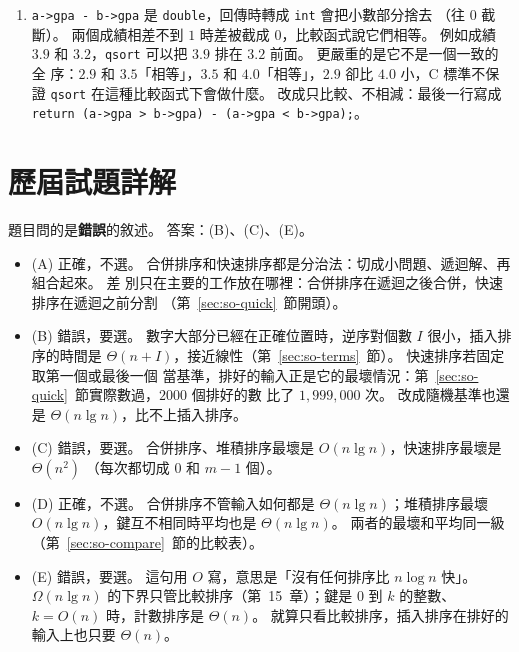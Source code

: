 \begin{enumerate}
(c) $z_k$ 參與的比較就是 $\sum_{j \ne k} X_{kj}$，期望值是
\[
\sum_{j \ne k} \frac{2}{|j - k| + 1}
= 2\left(\frac12 + \cdots + \frac1k\right) + 2\left(\frac12 + \cdots + \frac{1}{n-k+1}\right)
= 2(H_k + H_{n-k+1} - 2).
\]
每次比較有兩個數參與，所以把 $k = 1..n$ 加起來再除以 $2$：
$\mathrm{E}[X] = \sum_{k=1}^{n}(H_k + H_{n-k+1} - 2) = 2\sum_{k=1}^{n} H_k - 2n$。 用
$\sum_{k=1}^{n} H_k = (n+1)H_n - n$，得到 $2(n+1)H_n - 4n$，和定理~\ref{thm:so-quick-avg}
一樣。 這和第~9~章第~\ref{sec:bst-height}~節框裡 $j$ 的期望深度 $H_j + H_{n-j+1} - 2$ 只差一個 $2$ 倍：BST 裡
只算祖先，快速排序裡兩個方向都算。

\item \texttt{a->gpa - b->gpa} 是 \texttt{double}，回傳時轉成 \texttt{int} 會把小數部分捨去
（往 $0$ 截斷）。 兩個成績相差不到 $1$ 時差被截成 $0$，比較函式說它們相等。 例如成績
$3.9$ 和 $3.2$，\texttt{qsort} 可以把 $3.9$ 排在 $3.2$ 前面。 更嚴重的是它不是一個一致的全
序：$2.9$ 和 $3.5$「相等」，$3.5$ 和 $4.0$「相等」，$2.9$ 卻比 $4.0$ 小，C 標準不保證
\texttt{qsort} 在這種比較函式下會做什麼。 改成只比較、不相減：最後一行寫成
\texttt{return (a->gpa > b->gpa) - (a->gpa < b->gpa);}。
\end{enumerate}

\section*{歷屆試題詳解}

題目問的是\textbf{錯誤}的敘述。 答案：(B)、(C)、(E)。
\begin{itemize}
\item (A) 正確，不選。 合併排序和快速排序都是分治法：切成小問題、遞迴解、再組合起來。 差
別只在主要的工作放在哪裡：合併排序在遞迴之後合併，快速排序在遞迴之前分割
（第~\ref{sec:so-quick}~節開頭）。
\item (B) 錯誤，要選。 數字大部分已經在正確位置時，逆序對個數 $I$ 很小，插入排序的時間是
$\Theta(n + I)$，接近線性（第~\ref{sec:so-terms}~節）。 快速排序若固定取第一個或最後一個
當基準，排好的輸入正是它的最壞情況：第~\ref{sec:so-quick}~節實際數過，$2000$ 個排好的數
比了 $1{,}999{,}000$ 次。 改成隨機基準也還是 $\Theta(n \lg n)$，比不上插入排序。
\item (C) 錯誤，要選。 合併排序、堆積排序最壞是 $O(n \lg n)$，快速排序最壞是 $\Theta(n^2)$
（每次都切成 $0$ 和 $m - 1$ 個）。
\item (D) 正確，不選。 合併排序不管輸入如何都是 $\Theta(n \lg n)$；堆積排序最壞
$O(n \lg n)$，鍵互不相同時平均也是 $\Theta(n \lg n)$。 兩者的最壞和平均同一級
（第~\ref{sec:so-compare}~節的比較表）。
\item (E) 錯誤，要選。 這句用 $O$ 寫，意思是「沒有任何排序比 $n \log n$ 快」。 $\Omega(n \lg n)$
的下界只管比較排序（第~15~章）；鍵是 $0$ 到 $k$ 的整數、$k = O(n)$ 時，計數排序是
$\Theta(n)$。 就算只看比較排序，插入排序在排好的輸入上也只要 $\Theta(n)$。
\end{itemize}

